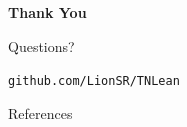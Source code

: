 \documentclass[aspectratio=169,10pt]{beamer}
\begin{document}
{%
\begin{frame}
    \begin{center}
        \vspace{2em}
        \Huge\textbf{\textcolor{leangreen}{Thank You}}

        \vspace{1.2em}
        \LARGE Questions?

        \vspace{1.5em}
        \large\texttt{github.com/LionSR/TNLean}
    \end{center}
\end{frame}
}

\begin{frame}[allowframebreaks]{References}

\end{frame}

\appendix
\end{document}
